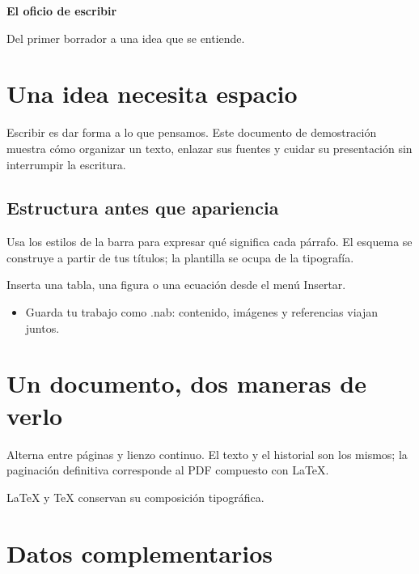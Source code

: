 \documentclass[12pt,a4paper]{article}
\begin{document}
\begin{abstract}Prueba tipográfica de \LaTeX{}: español, áéíóú y referencias.\end{abstract}
\fontsize{12.0}{14.399999999999999}\selectfont
{\LARGE\bfseries El oficio de escribir\par}

{\large Del primer borrador a una idea que se entiende.\par}

\section{Una idea necesita espacio}\label{b620E1581-D159-4E45-AFE1-A00A37AA7FDE}

Escribir es dar forma a lo que pensamos. Este documento de demostración muestra cómo organizar un texto, enlazar sus fuentes y cuidar su presentación sin interrumpir la escritura.

\subsection{Estructura antes que apariencia}\label{b1C27E752-BF49-42A6-BAA8-2B6CAB0DCA85}

Usa los estilos de la barra para expresar qué significa cada párrafo. El esquema se construye a partir de tus títulos; la plantilla se ocupa de la tipografía.

Inserta una tabla, una figura o una ecuación desde el menú Insertar.

\begin{itemize}
\item Guarda tu trabajo como .nab: contenido, imágenes y referencias viajan juntos.

\end{itemize}
\section{Un documento, dos maneras de verlo}\label{b2CE21FB0-D229-480C-8733-6693020FC6F3}

Alterna entre páginas y lienzo continuo. El texto y el historial son los mismos; la paginación definitiva corresponde al PDF compuesto con \LaTeX{}.

\LaTeX{} y \TeX{} conservan su composición tipográfica.

\appendix
\section{Datos complementarios}\label{bDC535091-139F-4D32-A531-DB1F9D43CE40}
\end{document}
